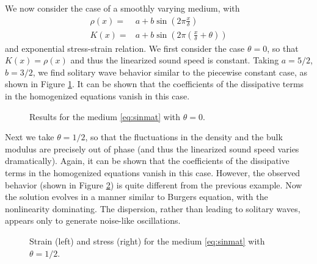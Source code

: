 We now consider the case of a smoothly varying medium, with
\begin{subequations}
\label{eq:sinmat}
\begin{align}
\rho(x) = & a + b \sin\left(2\pi \frac{x}{\delta}\right) \\
K(x) = & a + b \sin\left(2\pi\left(\frac{x}{\delta}+\theta\right)\right)
\end{align}
\end{subequations}
and exponential stress-strain relation.
We first consider the case $\theta=0$, so that $K(x)=\rho(x)$ and thus
the linearized sound speed is constant.  Taking $a=5/2$, $b=3/2$, we find solitary
wave behavior similar to the piecewise constant case, as shown in Figure
\ref{fig:sinoton}.  It can be shown that the coefficients of the dissipative
terms in the homogenized equations vanish in this case.

\begin{figure}
\begin{center}
\caption{Results for the medium \eqref{eq:sinmat} with $\theta=0$. \label{fig:sinoton}}
\end{center}
\end{figure}

Next we take $\theta=1/2$, so that the fluctuations in the density and the
bulk modulus are precisely out of phase (and thus the linearized sound speed 
varies dramatically).  Again, it can be shown that the coefficients of the 
dissipative terms in the homogenized equations vanish in this case.  However, the 
observed behavior (shown in Figure \ref{fig:oop}) is quite different from 
the previous example.  Now the
solution evolves in a manner similar to Burgers equation, with the nonlinearity
dominating.  The dispersion, rather than leading to solitary waves, appears only
to generate noise-like oscillations.

\begin{figure}
\begin{center}
\caption{Strain (left) and stress (right) for the medium \eqref{eq:sinmat} with $\theta=1/2$. \label{fig:oop}}
\end{center}
\end{figure}

